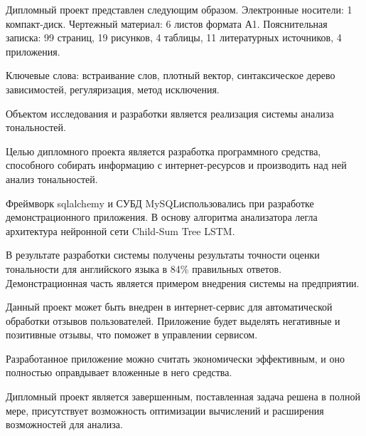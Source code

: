 \thispagestyle{empty}

Дипломный проект представлен следующим образом. Электронные носители: 1 компакт-диск. Чертежный материал: 6 листов формата А1. Пояснительная записка: 99 страниц, 19 рисунков, 4 таблицы, 11 литературных источников, 4 приложения.

Ключевые слова: встраивание слов, плотный вектор, синтаксическое дерево зависимостей, регуляризация, метод исключения.

Объектом исследования и разработки является реализация системы анализа тональностей.

Целью дипломного проекта является разработка программного средства, способного собирать информацию с интернет-ресурсов и производить над ней анализ тональностей.

Фреймворк sqlalchemy и СУБД MySQL\@ использовались при разработке демонстрационного приложения. В основу алгоритма анализатора легла архитектура нейронной сети Child-Sum Tree LSTM\@.

В результате разработки системы получены результаты точности оценки тональности для английского языка в 84\% правильных ответов. Демонстрационная часть является примером внедрения системы на предприятии.

Данный проект может быть внедрен в интернет-сервис для автоматической обработки отзывов пользователей. Приложение будет выделять негативные и позитивные отзывы, что поможет в управлении сервисом.

Разработанное приложение можно считать экономически эффективным, и оно полностью оправдывает вложенные в него средства.

Дипломный проект является завершенным, поставленная задача решена в полной мере, присутствует возможность оптимизации вычислений и расширения возможностей для анализа.

\clearpage
